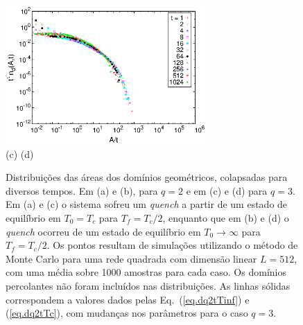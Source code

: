\begin{figure}
 \includegraphics[width=7.65cm]{fig/areasnp_col_q3_L512_Tinf_Tc2.eps} \\
\hspace{8mm} (c) \hspace{70mm} (d)
 \caption{Distribuições das áreas dos domínios geométricos, colapsadas para diversos tempos. Em (a) e (b), para $q=2$ e em (c) e (d) para $q=3$. Em (a) e (c) o sistema sofreu um \textit{quench} a partir de um estado de equilíbrio em $T_0=T_c$ para $T_f=T_c/2$, enquanto que em (b) e (d) o \textit{quench} ocorreu de um estado de equilíbrio em $T_0 \rightarrow \infty$ para $T_f=T_c/2$. Os pontos resultam de simulações utilizando o método de Monte Carlo para uma rede quadrada com dimensão linear $L=512$, com uma média sobre 1000 amostras para cada caso. Os domínios percolantes não foram incluídos nas distribuições. As linhas sólidas correspondem a valores dados pelas Eq.~(\ref{eq.dq2tTinf}) e (\ref{eq.dq2tTc}), com mudanças nos parâmetros para o caso $q=3$.}
 \label{fig.AreasCol}
\end{figure}

